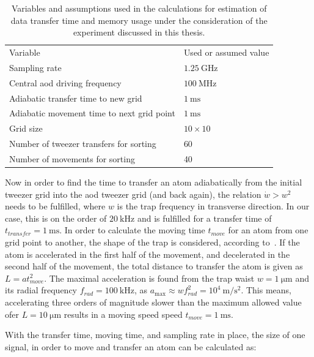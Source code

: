 \begin{table}[tb]%
\label{tbl:spectrum_assumptions}
\centering
\begin{tabular}{l l}
	\toprule \toprule
	Variable & Used or assumed value \\ \thickhline%
	Sampling rate & $\SI{1.25}{\giga\hertz}$ \\
	Central \ac{aod} driving frequency & $\SI{100}{\mega\hertz}$ \\
	Adiabatic transfer time to new grid & $\SI{1}{\milli\second}$ \\
	Adiabatic movement time to next grid point & $\SI{1}{\milli\second}$ \\
	Grid size & $10\times10$ \\
	Number of tweezer transfers for sorting & 60 \\
	Number of movements for sorting & 40 \\
	\bottomrule \bottomrule
\end{tabular}
\caption{Variables and assumptions used in the calculations for estimation of data transfer time and memory usage under the consideration of the experiment discussed in this thesis.}
\end{table}

Now in order to find the time to transfer an atom adiabatically from the initial tweezer grid into the \ac{aod} tweezer grid (and back again), the relation $\dot{w} > w^2$ needs to be fulfilled, where $w$ is the trap frequency in transverse direction. In our case, this is on the order of $\SI{20}{\kilo\hertz}$ and is fulfilled for a transfer time of $t_{transfer} = \SI{1}{\milli\second}$. In order to calculate the moving time $t_{move}$ for an atom from one grid point to another, the shape of the trap is considered, according to~\cite{Leseleuc2018}. If the atom is accelerated in the first half of the movement, and decelerated in the second half of the movement, the total distance to transfer the atom is given as $L=a t_{move}^2$. The maximal acceleration is found from the trap waist $w = \SI{1}{\micro\meter}$ and its radial frequency $f_{rad} = \SI{100}{\kilo\hertz}$, as $a_{\max} \approx w f_{rad}^2 = 10^4\SI{}{\meter\per\second\squared}$. This means, accelerating three orders of magnitude slower than the maximum allowed value ofer $L=\SI{10}{\micro\meter}$ results in a moving speed speed $t_{move} = \SI{1}{\milli\second}$.

With the transfer time, moving time, and sampling rate in place, the size of one signal, in order to move and transfer an atom can be calculated as:

